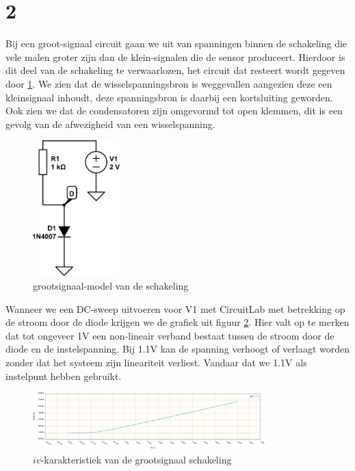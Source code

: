 \documentclass{report}
\begin{document}
\section{2}
Bij een groot-signaal circuit gaan we uit van spanningen binnen de schakeling die vele malen groter zijn dan de klein-signalen die de sensor produceert. Hierdoor is dit deel van de schakeling te verwaarlozen, het circuit dat resteert wordt gegeven door \ref{fig:groot}.
We zien dat de wisselspanningsbron is weggevallen aangezien deze een kleinsignaal inhoudt, deze spanningsbron is daarbij een kortsluiting geworden. Ook zien we dat de condensatoren zijn omgevormd tot open klemmen, dit is een gevolg van de afwezigheid van een wisselspanning.
\begin{figure}[H]
	\centering
	\includegraphics[width=0.3\textwidth]{grootsignaalmodel.png}
	\caption{grootsignaal-model van de schakeling}
	\label{fig:groot}
\end{figure}

\noindent Wanneer we een DC-sweep uitvoeren voor V1 met CircuitLab met betrekking op de stroom door de diode krijgen we de grafiek uit figuur \ref{fig:iv-groot}. Hier valt op te merken dat tot ongeveer 1V een non-lineair verband bestaat tussen de stroom door de diode en de instelspanning. Bij 1.1V kan de spanning verhoogt of verlaagt worden zonder dat het systeem zijn lineariteit verliest. Vandaar dat we 1.1V als instelpunt hebben gebruikt.

\begin{figure}[H]
	\centering
	\includegraphics[width=0.8\textwidth]{iv-groot.png}
	\caption{$iv$-karakteristiek van de grootsignaal schakeling}
	\label{fig:iv-groot}
\end{figure}
\end{document}
